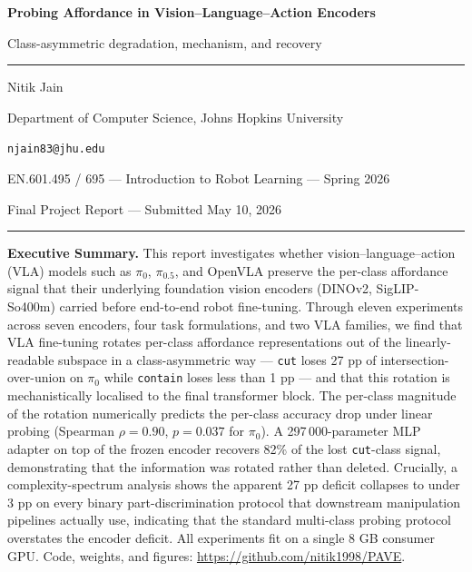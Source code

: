 \documentclass[11pt]{article}
\begin{document}
\begin{center}
\vspace*{0.4cm}
{\Large\bfseries Probing Affordance in Vision--Language--Action Encoders\par}
\vspace{0.4em}
{\large Class-asymmetric degradation, mechanism, and recovery\par}
\vspace{1.2em}
\rule{0.45\textwidth}{0.5pt}\par
\vspace{0.8em}
{\large Nitik Jain\par}
\vspace{0.3em}
{\small Department of Computer Science, Johns Hopkins University\par}
{\small \texttt{njain83@jhu.edu}\par}
\vspace{1.0em}
{\small EN.601.495 / 695 --- Introduction to Robot Learning --- Spring 2026\par}
{\small Final Project Report --- Submitted May 10, 2026\par}
\vspace{0.6em}
\rule{0.45\textwidth}{0.5pt}\par
\vspace{1.2em}
\end{center}

\noindent\textbf{Executive Summary.}\enspace
This report investigates whether vision--language--action (VLA) models such as
$\pi_0$, $\pi_{0.5}$, and OpenVLA preserve the per-class affordance signal
that their underlying foundation vision encoders (DINOv2, SigLIP-So400m)
carried before end-to-end robot fine-tuning. Through eleven experiments
across seven encoders, four task formulations, and two VLA families, we
find that VLA fine-tuning rotates per-class affordance representations out
of the linearly-readable subspace in a class-asymmetric way ---
\texttt{cut} loses 27 pp of intersection-over-union on $\pi_0$ while
\texttt{contain} loses less than 1 pp --- and that this rotation is
mechanistically localised to the final transformer block. The per-class
magnitude of the rotation numerically predicts the per-class accuracy drop
under linear probing (Spearman $\rho = 0.90$, $p = 0.037$ for $\pi_0$). A
297\,000-parameter MLP adapter on top of the frozen encoder recovers 82\%
of the lost \texttt{cut}-class signal, demonstrating that the information
was rotated rather than deleted. Crucially, a complexity-spectrum analysis
shows the apparent 27 pp deficit collapses to under 3 pp on every binary
part-discrimination protocol that downstream manipulation pipelines
actually use, indicating that the standard multi-class probing protocol
overstates the encoder deficit. All experiments fit on a single 8 GB
consumer GPU. Code, weights, and figures: \url{https://github.com/nitik1998/PAVE}.
\end{document}
